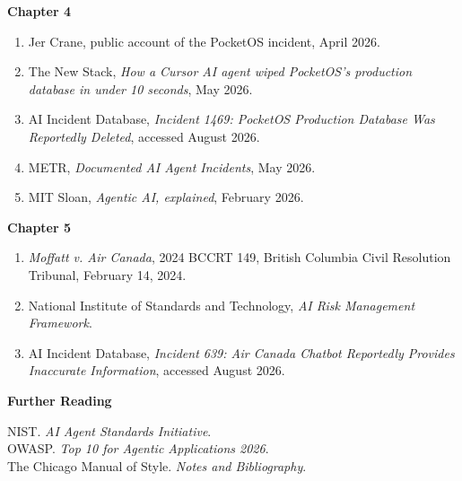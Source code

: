 \documentclass[10pt,twoside]{article}
\begin{document}
\vspace{18pt}
{\sffamily\bfseries\large Chapter 4}\par\vspace{10pt}
\begin{enumerate}\itemsep=8pt
\item Jer Crane, public account of the PocketOS incident, April 2026.
\item The New Stack, \emph{How a Cursor AI agent wiped PocketOS’s production database in under 10 seconds}, May 2026.
\item AI Incident Database, \emph{Incident 1469: PocketOS Production Database Was Reportedly Deleted}, accessed August 2026.
\item METR, \emph{Documented AI Agent Incidents}, May 2026.
\item MIT Sloan, \emph{Agentic AI, explained}, February 2026.
\end{enumerate}
\vspace{18pt}
{\sffamily\bfseries\large Chapter 5}\par\vspace{10pt}
\begin{enumerate}\itemsep=8pt
\item \emph{Moffatt v. Air Canada}, 2024 BCCRT 149, British Columbia Civil Resolution Tribunal, February 14, 2024.
\item National Institute of Standards and Technology, \emph{AI Risk Management Framework}.
\item AI Incident Database, \emph{Incident 639: Air Canada Chatbot Reportedly Provides Inaccurate Information}, accessed August 2026.
\end{enumerate}
\vspace{20pt}
{\sffamily\bfseries\large Further Reading}\par\vspace{10pt}
NIST. \emph{AI Agent Standards Initiative}.\\
OWASP. \emph{Top 10 for Agentic Applications 2026}.\\
The Chicago Manual of Style. \emph{Notes and Bibliography}.\\
\end{document}
